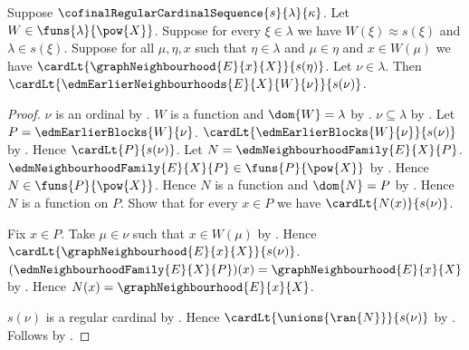 \begin{theorem}\label{edm_earlier_neighbourhoods_small}
    Suppose $\cofinalRegularCardinalSequence{s}{\lambda}{\kappa}$.
    Let $W\in\funs{\lambda}{\pow{X}}$.
    Suppose for every $\xi\in\lambda$ we have
        $W(\xi)\approx s(\xi)$ and $\lambda\in s(\xi)$.
    Suppose for all $\mu,\eta,x$ such that $\eta\in\lambda$ and
        $\mu\in\eta$ and $x\in W(\mu)$ we have
        $\cardLt{\graphNeighbourhood{E}{x}{X}}{s(\eta)}$.
    Let $\nu\in\lambda$.
    Then $\cardLt{\edmEarlierNeighbourhoods{E}{X}{W}{\nu}}{s(\nu)}$.
\end{theorem}
\begin{proof}
    $\nu$ is an ordinal by .
    $W$ is a function and $\dom{W}=\lambda$ by
        .
    $\nu\subseteq\lambda$ by .
    Let $P=\edmEarlierBlocks{W}{\nu}$.
    $\cardLt{\edmEarlierBlocks{W}{\nu}}{s(\nu)}$ by
        .
    Hence $\cardLt{P}{s(\nu)}$.
    Let $N=\edmNeighbourhoodFamily{E}{X}{P}$.
    $\edmNeighbourhoodFamily{E}{X}{P}\in\funs{P}{\pow{X}}$ by
        .
    Hence $N\in\funs{P}{\pow{X}}$.
    Hence $N$ is a function and $\dom{N}=P$ by
        .
    Hence $N$ is a function on $P$.
    Show that for every $x\in P$ we have
        $\cardLt{N(x)}{s(\nu)}$.
    \begin{subproof}
        Fix $x\in P$.
        Take $\mu\in\nu$ such that $x\in W(\mu)$ by
            .
        Hence $\cardLt{\graphNeighbourhood{E}{x}{X}}{s(\nu)}$.
        $(\edmNeighbourhoodFamily{E}{X}{P})(x)
            =\graphNeighbourhood{E}{x}{X}$ by
            .
        Hence $N(x)=\graphNeighbourhood{E}{x}{X}$.
    \end{subproof}
    $s(\nu)$ is a regular cardinal by
        .
    Hence $\cardLt{\unions{\ran{N}}}{s(\nu)}$ by
        .
    Follows by .
\end{proof}

